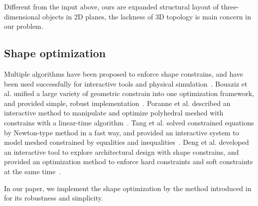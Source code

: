 Different from the input above, ours are expanded structural layout of three-dimensional objects in 2D planes, the lackness of 3D topology is main concern in our problem.

\subsection{Shape optimization}
Multiple algorithms have been proposed to enforce shape constrains, and have been used successfully for interactive tools and physical simulation~\cite{Botsch:2006:PCP:1281957.1281959,Igarashi:2005:ASM:1186822.1073323}. Bouaziz et al.  unified a large variety of geometric constrain into one optimization framework, and provided simple, robust implementation~\cite{Bouaziz:2012:SSD:2346796.2346802}. Poranne et al. described an interactive method to manipulate and optimize polyhedral meshed with constrains with a linear-time algorithm~\cite{Poranne2013Interactive}. Tang et al. solved constrained equations by Newton-type method in a fast way, and provided an interactive system to model meshed constrained by equalities and inequalities~\cite{Tang:2014:FPM:2601097.2601213}. Deng et al. developed an interactive tool to explore architectural design with shape constrains, and provided an optimization method to enforce hard constraints and soft constraints at the same time~\cite{Deng2015}. 

In our paper, we implement the shape optimization by the method introduced in \cite{Bouaziz:2012:SSD:2346796.2346802} for its robustness and simplicity.



